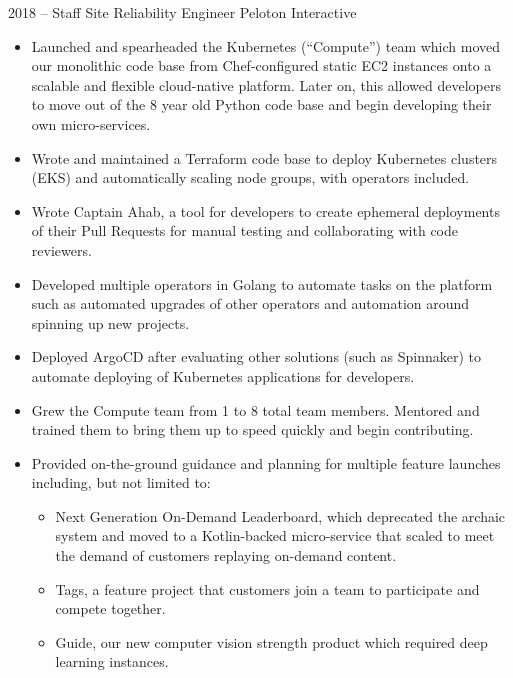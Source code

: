 \documentclass[9pt]{developercv}
\begin{document}


\begin{entrylist}
	\entry
		{2018 -- }
		{Staff Site Reliability Engineer}
		{Peloton Interactive}
		{
		  \begin{itemize}
			\item Launched and spearheaded the Kubernetes (``Compute'') team which moved our monolithic code base from Chef-configured static EC2 instances onto a scalable and flexible cloud-native platform. Later on, this allowed developers to move out of the 8 year old Python code base and begin developing their own micro-services.
			\item Wrote and maintained a Terraform code base to deploy Kubernetes clusters (EKS) and automatically scaling node groups, with operators included.
			\item Wrote Captain Ahab, a tool for developers to create ephemeral deployments of their Pull Requests for manual testing and collaborating with code reviewers.
			\item Developed multiple operators in Golang to automate tasks on the platform such as automated upgrades of other operators and automation around spinning up new projects.
			\item Deployed ArgoCD after evaluating other solutions (such as Spinnaker) to automate deploying of Kubernetes applications for developers.
			\item Grew the Compute team from 1 to 8 total team members. Mentored and trained them to bring them up to speed quickly and begin contributing.
			\item Provided on-the-ground guidance and planning for multiple feature launches including, but not limited to:
				  \begin{itemize}
					\item Next Generation On-Demand Leaderboard, which deprecated the archaic system and moved to a Kotlin-backed micro-service that scaled to meet the demand of customers replaying on-demand content.
					\item Tags, a feature project that customers join a team to participate and compete together.
					\item Guide, our new computer vision strength product which required deep learning instances.
				  \end{itemize}

\end{itemize}}
\end{entrylist}
\end{document}
